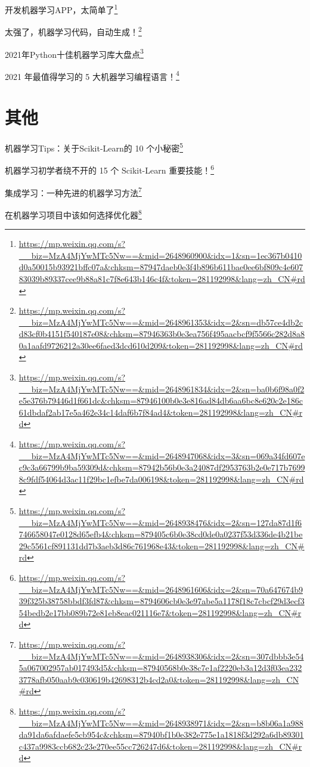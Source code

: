 \documentclass[]{ctexbook}
\renewcommand{\href}[2]{#2\footnote{\url{#1}}}
\begin{document}
\href{https://mp.weixin.qq.com/s?__biz=MzA4MjYwMTc5Nw==\&mid=2648960900\&idx=1\&sn=1ec367b0410d0a50015b93921bffc07a\&chksm=87947daeb0e3f4b896b611bae0ee6bf809c4e60783039b89337cee9b88a81c7f8e643b146c4f\&token=281192998\&lang=zh_CN\#rd}{开发机器学习APP，太简单了}

\href{https://mp.weixin.qq.com/s?__biz=MzA4MjYwMTc5Nw==\&mid=2648961353\&idx=2\&sn=db57ce4db2cd83cf0b4151f540187e08\&chksm=87946363b0e3ea756f495aacbcf9f5566c282d8a80a1aafd9726212a30ee6faed3dcd610d209\&token=281192998\&lang=zh_CN\#rd}{太强了，机器学习代码，自动生成！}

\href{https://mp.weixin.qq.com/s?__biz=MzA4MjYwMTc5Nw==\&mid=2648961834\&idx=2\&sn=ba0b6f98a0f2e5e376b79446d1f661dc\&chksm=87946100b0e3e816ad84db6aa6bc8e620c2e186c61dbdaf2ab17e5a462e34c14daf6b7f84ad4\&token=281192998\&lang=zh_CN\#rd}{2021年Python十佳机器学习库大盘点}

\href{https://mp.weixin.qq.com/s?__biz=MzA4MjYwMTc5Nw==\&mid=2648947068\&idx=3\&sn=069a34fd607ec9c3a66799b9ba59309d\&chksm=87942b56b0e3a24087df2953763b2e0e717b76998c9fdf54064d3ac11f29bc1efbe7da006198\&token=281192998\&lang=zh_CN\#rd}{2021 年最值得学习的 5 大机器学习编程语言！}

\hypertarget{ux5176ux4ed6}{%
\section{其他}\label{ux5176ux4ed6}}

\href{https://mp.weixin.qq.com/s?__biz=MzA4MjYwMTc5Nw==\&mid=2648938476\&idx=2\&sn=127da87d1f6746658047e0128d65efb4\&chksm=879405c6b0e38cd0de0a0237f53d336de4b21be29c5561cf891131dd7b3aeb3d86c761968e43\&token=281192998\&lang=zh_CN\#rd}{机器学习Tips：关于Scikit-Learn的 10 个小秘密}

\href{https://mp.weixin.qq.com/s?__biz=MzA4MjYwMTc5Nw==\&mid=2648961606\&idx=2\&sn=70a647674b939f325b38758bbdf3fd87\&chksm=8794606cb0e3e97abe5a1178f18c7cbcf29d3ecf354bedb2e17bb089b72e81eb8eac021116e7\&token=281192998\&lang=zh_CN\#rd}{机器学习初学者绕不开的 15 个 Scikit-Learn 重要技能！}

\href{https://mp.weixin.qq.com/s?__biz=MzA4MjYwMTc5Nw==\&mid=2648938306\&idx=2\&sn=307dbbb3e545a067002957ab017493d5\&chksm=87940568b0e38c7e1af2220eb3a12d3f03ea2323778afb050aab9c030619b42698312b4cd2a0\&token=281192998\&lang=zh_CN\#rd}{集成学习：一种先进的机器学习方法}

\href{https://mp.weixin.qq.com/s?__biz=MzA4MjYwMTc5Nw==\&mid=2648938971\&idx=2\&sn=b8b06a1a988da91da6afdaefe5cb954c\&chksm=87940bf1b0e382e775e1a1818f3d292a6db89301c437a9983ccb682c23e270ee55cc726247d6\&token=281192998\&lang=zh_CN\#rd}{在机器学习项目中该如何选择优化器}
\end{document}
